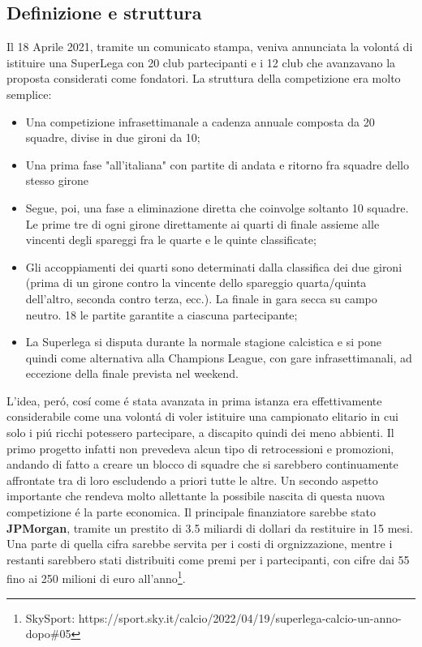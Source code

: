 \documentclass[
    corpo=12pt,
    oneside,
    evenboxes,
    tipotesi=triennale,
    stile=classica,
    oldstyle,
    autoretitolo,
    greek,
]{toptesi}
\begin{document}
\begin{interlinea}{1.5}
\section{Definizione e struttura}
Il 18 Aprile 2021, tramite un comunicato stampa, veniva annunciata la volont\'a di istituire una SuperLega con 20 club partecipanti e i 12 club
che avanzavano la proposta considerati come fondatori. La struttura della competizione era molto semplice: 
\begin{itemize}
    \item Una competizione infrasettimanale a cadenza annuale composta da 20 squadre, divise in due gironi da 10;
    \item Una prima fase "all’italiana" con partite di andata e ritorno fra squadre dello stesso girone
    \item Segue, poi, una fase a eliminazione diretta che coinvolge soltanto 10 squadre. Le prime tre di ogni 
    girone direttamente ai quarti di finale assieme alle vincenti degli spareggi fra le quarte e le quinte classificate;
    \item Gli accoppiamenti dei quarti sono determinati dalla classifica dei due gironi (prima di un girone contro la vincente 
    dello spareggio quarta/quinta dell’altro, seconda contro terza, ecc.). La finale in gara secca su campo neutro. 
    18 le partite garantite a ciascuna partecipante;
    \item La Superlega si disputa durante la normale stagione calcistica e si pone quindi come alternativa alla Champions League, 
    con gare infrasettimanali, ad eccezione della finale prevista nel weekend.
\end{itemize}
L'idea, per\'o, cos\'i come \'e stata avanzata in prima istanza era effettivamente considerabile come una volont\'a di voler istituire 
una campionato elitario in cui solo i pi\'u ricchi potessero partecipare, a discapito quindi dei meno abbienti. Il primo progetto infatti non prevedeva
alcun tipo di retrocessioni e promozioni, andando di fatto a creare un blocco di squadre che si sarebbero continuamente affrontate tra di loro
escludendo a priori tutte le altre. Un secondo aspetto importante che rendeva molto allettante la possibile nascita di questa nuova competizione
\'e la parte economica. Il principale finanziatore sarebbe stato \textbf{JPMorgan}, tramite un prestito di 3.5 miliardi di dollari da restituire
in 15 mesi. Una parte di quella cifra sarebbe servita per i costi di orgnizzazione, mentre i restanti sarebbero stati distribuiti come premi per i partecipanti,
con cifre dai 55 fino ai 250 milioni di euro all'anno\footnote{SkySport: https://sport.sky.it/calcio/2022/04/19/superlega-calcio-un-anno-dopo\#05}. 

\end{interlinea}
\end{document}
